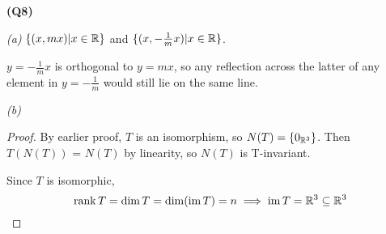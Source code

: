\documentclass[12pt, a4paper]{article}
\newcommand{\im}{\operatorname{im}}
\newcommand{\rank}{\operatorname{rank}}
\begin{document}
\textbf{(Q8)}

\textit{(a)}
$\{(x, mx) | x \in \mathbb{R}\}$ and $\{(x, -\tfrac{1}{m}x) | x \in \mathbb{R}\}$.

$y = -\frac{1}{m}x$ is orthogonal to $y = mx$, so any reflection across
the latter of any element in $y = -\frac{1}{m}$ would still lie on the
same line.

\textit{(b)}
\begin{proof}
    By earlier proof, $T$ is an isomorphism, so $N(T) = \{0_{\mathbb{R}^3}\}$.
    Then $T(N(T))$ = $N(T)$ by linearity, so $N(T)$ is T-invariant.

    Since $T$ is isomorphic, 
    \[
        \rank T = \dim T = \dim (\im T) = n \implies
        \im T = \R^3 \sse \R^3
    \]
\end{proof}
\end{document}
